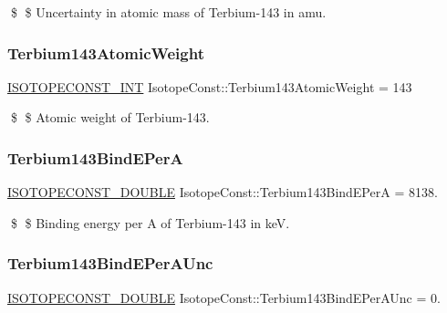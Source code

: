 \$ \$ Uncertainty in atomic mass of Terbium-\/143 in amu. \mbox{\label{group___isotope_const-_terbium-_tb143_gaa0a4c1f261077075426ef7d43d866214}} 
\subsubsection{\texorpdfstring{Terbium143\+Atomic\+Weight}{Terbium143AtomicWeight}}
{\footnotesize\ttfamily \mbox{\hyperlink{group___isotope_const-_macros_ga5f18360b3e99483a35c32d789e62621c}{I\+S\+O\+T\+O\+P\+E\+C\+O\+N\+S\+T\+\_\+\+I\+NT}} Isotope\+Const\+::\+Terbium143\+Atomic\+Weight = 143}

\$ \$ Atomic weight of Terbium-\/143. \mbox{\label{group___isotope_const-_terbium-_tb143_ga698a91000844446280f6b9cf56de712d}} 
\subsubsection{\texorpdfstring{Terbium143\+Bind\+E\+PerA}{Terbium143BindEPerA}}
{\footnotesize\ttfamily \mbox{\hyperlink{group___isotope_const-_macros_ga8f45a7272ce02c0b4c65c44636ed719a}{I\+S\+O\+T\+O\+P\+E\+C\+O\+N\+S\+T\+\_\+\+D\+O\+U\+B\+LE}} Isotope\+Const\+::\+Terbium143\+Bind\+E\+PerA = 8138.}

\$ \$ Binding energy per A of Terbium-\/143 in keV. \mbox{\label{group___isotope_const-_terbium-_tb143_ga808f25a34373b6bec7d84b87157018ce}} 
\subsubsection{\texorpdfstring{Terbium143\+Bind\+E\+Per\+A\+Unc}{Terbium143BindEPerAUnc}}
{\footnotesize\ttfamily \mbox{\hyperlink{group___isotope_const-_macros_ga8f45a7272ce02c0b4c65c44636ed719a}{I\+S\+O\+T\+O\+P\+E\+C\+O\+N\+S\+T\+\_\+\+D\+O\+U\+B\+LE}} Isotope\+Const\+::\+Terbium143\+Bind\+E\+Per\+A\+Unc = 0.}

